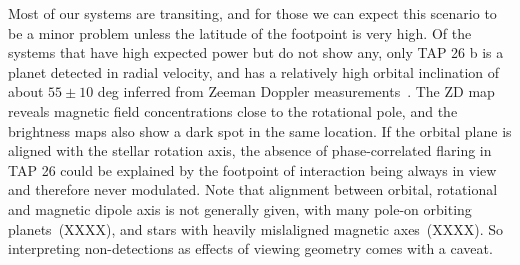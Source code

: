 \documentclass[twocolumn]{aastex631}
\begin{document}
Most of our systems are transiting, and for those we can expect this scenario to be a minor problem unless the latitude of the footpoint is very high. Of the systems that have high expected power but do not show any, only TAP 26 b is a planet detected in radial velocity, and has a relatively high orbital inclination of about $55\pm10$ deg inferred from Zeeman Doppler measurements~\citep{yu2017hot}. The ZD map reveals magnetic field concentrations close to the rotational pole, and the brightness maps also show a dark spot in the same location. If the orbital plane is aligned with the stellar rotation axis, the absence of phase-correlated flaring in TAP 26 could be explained by the footpoint of interaction being always in view and therefore never modulated. Note that alignment between orbital, rotational and magnetic dipole axis is not generally given, with many pole-on orbiting planets~(XXXX), and stars with heavily mislaligned magnetic axes~(XXXX). So interpreting non-detections as effects of viewing geometry comes with a caveat. 






\end{document}
